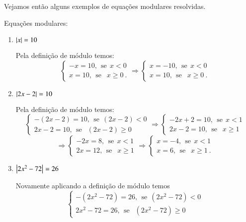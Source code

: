 \newpage
Vejamos então alguns exemplos de equações modulares resolvidas.

\begin{exem} Equações modulares:
 \begin{enumerate}
  \item $\left|x\right|= 10$

  Pela definição de módulo temos:
  \[
  \begin{cases}
      -x= 10, \ \ \text{se} \ \ x<0 \\
      x= 10, \ \ \text{se } \ \ x \geq 0 \ .
     \end{cases}
     \Rightarrow
     \begin{cases}
      x= -10, \ \ \text{se} \ \ x<0 \\
      x= 10, \ \ \text{se } \ \ x \geq 0 \ .
     \end{cases}
  \]

 \item $\left|2x-2\right|= 10$

  Pela definição de módulo temos:
  \[
  \begin{cases}
      -(2x-2)= 10, \ \ \text{se} \ \ (2x-2)<0 \\
      2x-2= 10, \ \ \text{se } \ \ (2x-2) \geq 0
     \end{cases}
     \Rightarrow
     \begin{cases}
      -2x + 2= 10, \ \ \text{se} \ \ x< 1 \\
      2x - 2= 10, \ \ \text{se } \ \ x \geq 1
     \end{cases}
     \]
     \[
     \Rightarrow
     \begin{cases}
      -2x= 8, \ \ \text{se} \ \ x< 1 \\
       2x= 12, \ \ \text{se } \ \ x \geq 1
     \end{cases}
     \Rightarrow
     \begin{cases}
      x= -4, \ \ \text{se} \ \ x< 1 \\
      x= 6, \ \ \text{se } \ \ x \geq 1 \ .
     \end{cases}
  \]

  \item $\left|2x^2 - 72\right|= 26$

  Novamente aplicando a definição de módulo temos
    \[
    \begin{cases}
      -(2x^2-72)= 26, \ \ \text{se} \ \ (2x^2-72)<0 \\
      2x^2- 72= 26, \ \ \text{se } \ \ (2x^2-72) \geq 0
     \end{cases}
     \]


\end{enumerate}
\end{exem}

